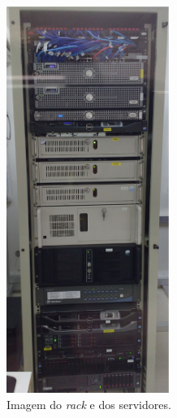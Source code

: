 \begin{figure}[h!]
 \centering
 \includegraphics[width=200px]{img/servrack.eps}
 \caption{Imagem do \textit{rack} e dos servidores.}
 \label{fig:servrack}
\end{figure}

